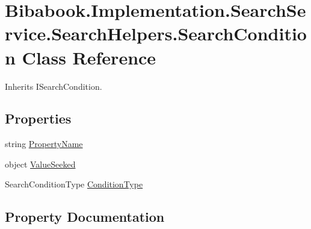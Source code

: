 \hypertarget{class_bibabook_1_1_implementation_1_1_search_service_1_1_search_helpers_1_1_search_condition}{}\section{Bibabook.\+Implementation.\+Search\+Service.\+Search\+Helpers.\+Search\+Condition Class Reference}
\label{class_bibabook_1_1_implementation_1_1_search_service_1_1_search_helpers_1_1_search_condition}


Inherits I\+Search\+Condition.

\subsection*{Properties}
\begin{DoxyCompactItemize}
\item 
string \hyperlink{class_bibabook_1_1_implementation_1_1_search_service_1_1_search_helpers_1_1_search_condition_a27ffc146a7b383bc22fddd9038b19535}{Property\+Name}
\item 
object \hyperlink{class_bibabook_1_1_implementation_1_1_search_service_1_1_search_helpers_1_1_search_condition_a03fb0b6daa71f2dc653180d8618bf4ae}{Value\+Seeked}
\item 
Search\+Condition\+Type \hyperlink{class_bibabook_1_1_implementation_1_1_search_service_1_1_search_helpers_1_1_search_condition_ad687a38f2ac1b652ba4f621fa3bbd983}{Condition\+Type}
\end{DoxyCompactItemize}


\subsection{Property Documentation}
\hypertarget{class_bibabook_1_1_implementation_1_1_search_service_1_1_search_helpers_1_1_search_condition_ad687a38f2ac1b652ba4f621fa3bbd983}{}
